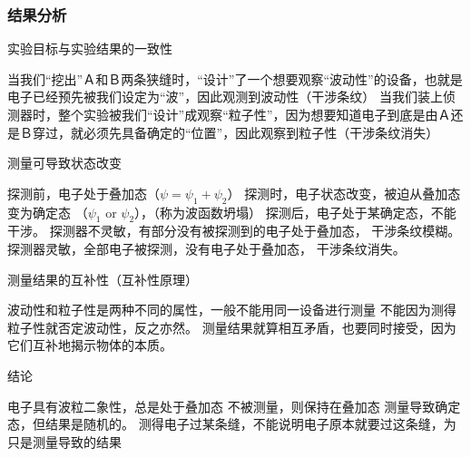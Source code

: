 \begin{frame} 
    \frametitle{结果分析}
    \begin{enumerate}
        \Item 实验目标与实验结果的一致性\\
        \begin{itemize}
            \IItem 当我们“挖出”Ａ和Ｂ两条狭缝时，“设计”了一个想要观察“波动性”的设备，也就是电子已经预先被我们设定为“波”，因此观测到波动性（干涉条纹）
            \IItem 当我们装上侦测器时，整个实验被我们“设计”成观察“粒子性”，因为想要知道电子到底是由Ａ还是Ｂ穿过，就必须先具备确定的“位置”，因此观察到粒子性（干涉条纹消失）
        \end{itemize}
        \Item 测量可导致状态改变\\
        \begin{itemize}
            \IItem 探测前，电子处于叠加态（$ \psi =\psi_1+\psi_2$）
            \IItem 探测时，电子状态改变，被迫从叠加态变为确定态 （$\psi_1$ or $\psi_2$），（称为波函数坍塌）
            \IItem 探测后，电子处于某确定态，不能干涉。
            \IItem 探测器不灵敏，有部分没有被探测到的电子处于叠加态， 干涉条纹模糊。
            \IItem 探测器灵敏，全部电子被探测，没有电子处于叠加态， 干涉条纹消失。
        \end{itemize}
    \end{enumerate}
\end{frame}

\begin{frame}   
    \begin{enumerate}
        \Item 测量结果的互补性（互补性原理）\\
        \begin{itemize}
            \IItem 波动性和粒子性是两种不同的属性，一般不能用同一设备进行测量
            \IItem 不能因为测得粒子性就否定波动性，反之亦然。
            \IItem 测量结果就算相互矛盾，也要同时接受，因为它们互补地揭示物体的本质。
        \end{itemize}
        \Item 结论
        \begin{itemize}
            \IItem 电子具有波粒二象性，总是处于叠加态
            \IItem 不被测量，则保持在叠加态
            \IItem 测量导致确定态，但结果是随机的。
            \IItem 测得电子过某条缝，不能说明电子原本就要过这条缝，为只是测量导致的结果
        \end{itemize}
    \end{enumerate}
\end{frame}

